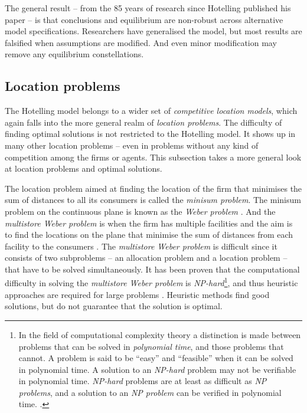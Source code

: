 \documentclass[preprint, 12pt]{elsarticle}
\begin{document}
The general result -- from the 85 years of research since Hotelling published his paper -- is that conclusions and equilibrium are non-robust across alternative model specifications. Researchers have generalised the model, but most results are falsified when assumptions are modified. And even minor modification may remove any equilibrium constellations.

\subsection{Location problems}

The Hotelling model belongs to a wider set of \emph{competitive location models}, which again falls into the more general realm of \emph{location problems}. The difficulty of finding optimal solutions is not restricted to the Hotelling model. It shows up in many other location problems -- even in problems without any kind of competition among the firms or agents. This subsection takes a more general look at location problems and optimal solutions.

The location problem aimed at finding the location of the firm that minimises the sum of distances to all its consumers is called the \emph{minisum problem}. The minisum problem on the continuous plane is known as the \emph{Weber problem} \citep[chapter~1]{Eiselt_Marianov_2011}. And the \emph{multistore Weber problem} is when the firm has multiple facilities and the aim is to find the locations on the plane that minimise the sum of distances from each facility to the consumers \citep[chapter~15]{Eiselt_Marianov_2011}. The \emph{multistore Weber problem} is difficult since it consists of two subproblems -- an allocation problem and a location problem -- that have to be solved simultaneously. It has been proven that the computational difficulty in solving the \emph{multistore Weber problem} is \emph{NP-hard}\footnote{In the field of computational complexity theory a distinction is made between problems that can be solved in \emph{polynomial time}, and those problems that cannot. A problem is said to be ``easy'' and ``feasible'' when it can be solved in polynomial time. A solution to an \emph{NP-hard} problem may not be verifiable in polynomial time. \emph{NP-hard} problems are at least as difficult as \emph{NP problems}, and a solution to an \emph{NP problem} can be verified in polynomial time. \citep[Appendix B]{Ahuja_Magnanti_Orlin_1988}.}, and thus heuristic approaches are required for large problems \citep[p.~336]{Eiselt_Marianov_2011}. Heuristic methods find good solutions, but do not guarantee that the solution is optimal.
\end{document}
